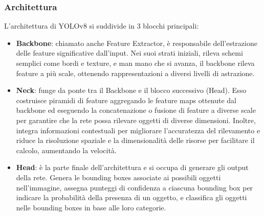 \newpage

\subsubsection{Architettura}
L'architettura di YOLOv8 si suddivide in 3 blocchi principali:
\begin{itemize}
  \item \textbf{Backbone}: chiamato anche Feature Extractor, è responsabile dell'estrazione delle feature significative dall'input. Nei suoi strati iniziali, rileva schemi semplici come bordi e texture, e man mano che si avanza, il backbone rileva feature a più scale, ottenendo rappresentazioni a diversi livelli di astrazione.
  \item \textbf{Neck}: funge da ponte tra il Backbone e il blocco successivo (Head). Esso costruisce piramidi di feature aggregando le feature maps ottenute dal backbone ed eseguendo la concatenazione o fusione di feature a diverse scale per garantire che la rete possa rilevare oggetti di diverse dimensioni. Inoltre, integra informazioni contestuali per migliorare l'accuratezza del rilevamento e riduce la risoluzione spaziale e la dimensionalità delle risorse per facilitare il calcolo, aumentando la velocità.
  \item \textbf{Head}: è la parte finale dell'architettura e si occupa di generare gli output della rete. Genera le bounding boxes associate ai possibili oggetti nell'immagine, assegna punteggi di confidenza a ciascuna bounding box per indicare la probabilità della presenza di un oggetto, e classifica gli oggetti nelle bounding boxes in base alle loro categorie.
\end{itemize}

\newpage

